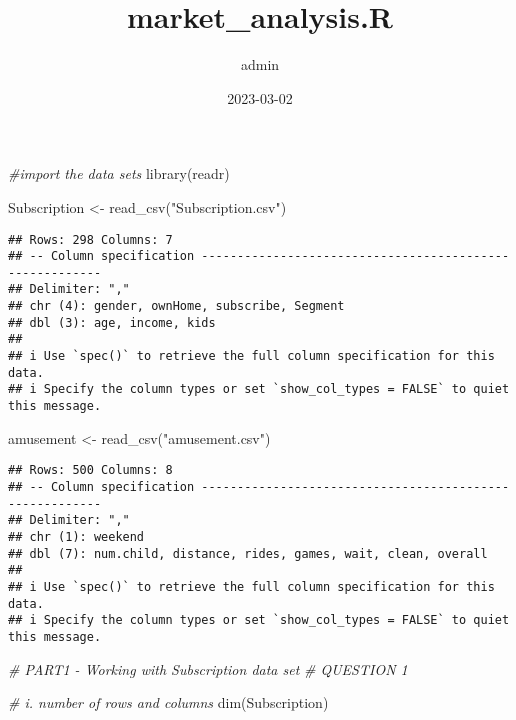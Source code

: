 \documentclass[
]{article}
\title{market\_analysis.R}
\author{admin}
\date{2023-03-02}
\newenvironment{Shaded}{\begin{snugshade}}{\end{snugshade}}
\newcommand{\CommentTok}[1]{\textcolor[rgb]{0.56,0.35,0.01}{\textit{#1}}}
\newcommand{\FunctionTok}[1]{\textcolor[rgb]{0.00,0.00,0.00}{#1}}
\newcommand{\NormalTok}[1]{#1}
\newcommand{\OtherTok}[1]{\textcolor[rgb]{0.56,0.35,0.01}{#1}}
\newcommand{\StringTok}[1]{\textcolor[rgb]{0.31,0.60,0.02}{#1}}
\begin{document}
\maketitle

\begin{Shaded}
\begin{Highlighting}[]
\CommentTok{\#import the data sets}
\FunctionTok{library}\NormalTok{(readr)}

\NormalTok{Subscription }\OtherTok{\textless{}{-}} \FunctionTok{read\_csv}\NormalTok{(}\StringTok{"Subscription.csv"}\NormalTok{)}
\end{Highlighting}
\end{Shaded}

\begin{verbatim}
## Rows: 298 Columns: 7
## -- Column specification --------------------------------------------------------
## Delimiter: ","
## chr (4): gender, ownHome, subscribe, Segment
## dbl (3): age, income, kids
## 
## i Use `spec()` to retrieve the full column specification for this data.
## i Specify the column types or set `show_col_types = FALSE` to quiet this message.
\end{verbatim}

\begin{Shaded}
\begin{Highlighting}[]
\NormalTok{amusement }\OtherTok{\textless{}{-}} \FunctionTok{read\_csv}\NormalTok{(}\StringTok{"amusement.csv"}\NormalTok{)}
\end{Highlighting}
\end{Shaded}

\begin{verbatim}
## Rows: 500 Columns: 8
## -- Column specification --------------------------------------------------------
## Delimiter: ","
## chr (1): weekend
## dbl (7): num.child, distance, rides, games, wait, clean, overall
## 
## i Use `spec()` to retrieve the full column specification for this data.
## i Specify the column types or set `show_col_types = FALSE` to quiet this message.
\end{verbatim}

\begin{Shaded}
\begin{Highlighting}[]
\CommentTok{\# PART1 {-} Working with Subscription data set}
\CommentTok{\# QUESTION 1}

\CommentTok{\# i. number of rows and columns}
\FunctionTok{dim}\NormalTok{(Subscription)}
\end{Highlighting}
\end{Shaded}
\end{document}
